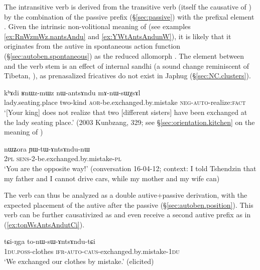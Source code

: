 The intransitive verb  is derived from the transitive verb  (itself the causative of ) by the combination of the passive  prefix (§\ref{sec:passive}) with the prefixal element . Given the intrinsic non-volitional meaning of  (see examples \ref{ex:RnWzmWz.nantsAndu} and \ref{ex:YWtAntsAndunW}), it is likely that it originates from the autive in spontaneous action function (§\ref{sec:autoben.spontaneous}) as the reduced allomorph . The  element between  and the verb stem  is an effect of internal sandhi  \fl{}  (a sound change reminiscent of Tibetan, \citealt{lifk33}), as prenasalized fricatives do not exist in Japhug (§\ref{sec:NC.clusters}).


\begin{exe}
\ex \label{ex:RnWzmWz.nantsAndu}
\gll kʰɤdi ʁnɯz-mɯz nɯ-antsɤndu mɤ-nɯ-sɯχsɤl \\
lady.seating.place two-kind \textsc{aor}-be.exchanged.by.mistake \textsc{neg}-\textsc{auto}-realize:\textsc{fact} \\
\glt `[Your king] does not realize that two [different sisters] have been exchanged at the lady seating place.' (2003 Kunbzang, 329; see §\ref{sec:orientation.kitchen} on the meaning of )
\end{exe}

\begin{exe}
\ex \label{ex:YWtAntsAndunW}
\gll nɯʑora ɲɯ-tɯ-ɤntsɤndu-nɯ \\
\textsc{2pl} \textsc{sens}-2-be.exchanged.by.mistake-\textsc{pl} \\
\glt `You are the opposite way!' (conversation 16-04-12; context: I told Tshendzin that my father and I cannot drive cars, while my mother and my wife can)
\end{exe}

The verb  can thus be analyzed as a double autive+passive derivation, with the expected placement of the autive after the passive (§\ref{sec:autoben.position}). This verb can be further causativized as  and even receive a second autive prefix as in (\ref{ex:tonWsAntsAndutCi}).

\begin{exe}
\ex \label{ex:tonWsAntsAndutCi}
\gll tɕi-ŋga to-nɯ-sɯ-ɤntsɤndu-tɕi \\
\textsc{1du}.\textsc{poss}-clothes \textsc{ifr}-\textsc{auto}-\textsc{caus}-exchanged.by.mistake-\textsc{1du} \\
\glt `We exchanged our clothes by mistake.' (elicited)
\end{exe}

